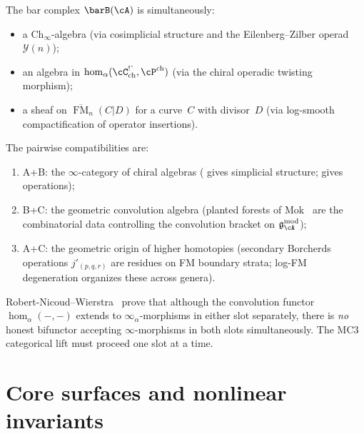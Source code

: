 \begin{remark}
\label{rem:three-pillar-triangle}
The bar complex
$\barB(\cA)$ is simultaneously:
\begin{itemize}
\item a $\mathrm{Ch}_\infty$-algebra (via cosimplicial structure
 and the Eilenberg--Zilber operad $\mathcal{Y}(n)$);
\item an algebra in
 $\operatorname{hom}_\alpha(\cC^{\textup{!\textasciigrave}}_{\mathrm{ch}},
 \cP^{\mathrm{ch}})$ (via the chiral operadic twisting
 morphism);
\item a sheaf on $\overline{\operatorname{FM}}_n(C|D)$ for a curve~$C$
 with divisor~$D$ (via log-smooth compactification of
 operator insertions).
\end{itemize}
The pairwise compatibilities are:
\begin{enumerate}[label=\textup{(\roman*)}]
\item A+B: the $\infty$-category of chiral algebras
 (\cite[Theorem~3.8]{Val16} gives simplicial structure; \cite{MS24}
 gives operations);
\item B+C: the geometric convolution algebra (planted forests of
 Mok~\cite{Mok25} are the combinatorial data controlling the
 convolution bracket on $\mathfrak{g}_\cA^{\mathrm{mod}}$);
\item A+C: the geometric origin of higher homotopies (secondary Borcherds
 operations $j'_{(p,q,r)}$ are residues on FM boundary strata; log-FM
 degeneration organizes these across genera).
\end{enumerate}
\end{remark}

\begin{remark}
\label{rem:no-bifunctor}
Robert-Nicoud--Wierstra~\cite[Section~6]{RNW19} prove that although
the convolution functor $\operatorname{hom}_\alpha(-,-)$ extends to
$\infty_\alpha$-morphisms in either slot separately, there is
\emph{no} honest bifunctor accepting $\infty$-morphisms in both slots
simultaneously. The MC3 categorical lift must proceed one slot at a
time.
\end{remark}


\section{Core surfaces and nonlinear invariants}
\label{sec:three-rings}

